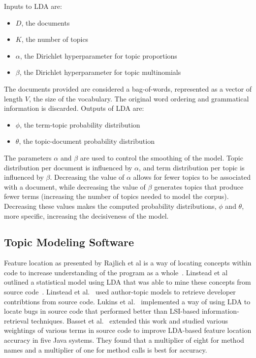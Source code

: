 Inputs to LDA are:
\begin{itemize}
\item $D$, the documents
\item $K$, the number of topics
\item $\alpha$, the Dirichlet hyperparameter for topic proportions
\item $\beta$, the Dirichlet hyperparameter for topic multinomials
\end{itemize}

The documents provided are considered a bag-of-words,
represented as a vector of length $V\!$, the size of the vocabulary.
The original word ordering and grammatical information is discarded.
Outputs of LDA are:
\begin{itemize}
\item $\phi$, the term-topic probability distribution
\item $\theta$, the topic-document probability distribution
\end{itemize}

The parameters $\alpha$ and $\beta$ are used to control the smoothing of the model.
Topic distribution per document is influenced by $\alpha$,
and term distribution per topic is influenced by $\beta$.
Decreasing the value of $\alpha$ allows for fewer topics to be associated with a document,
while decreasing the value of $\beta$ generates topics that produce fewer terms
(increasing the number of topics needed to model the corpus).
Decreasing these values makes the computed probability distributions, $\phi$ and $\theta$,
more specific, increasing the decisiveness of the model.

\subsection{Topic Modeling Software}

Feature location as presented by Rajlich et al
is a way of locating concepts within code to increase understanding of the program as a whole~\cite{Rajlich-Wilde:2002}.
Linstead et al outlined a statistical model using LDA that was able to mine these concepts from source code~\cite{Linstead-etal:2007b}.
Linstead et al.~\cite{Linstead-etal:2007} used author-topic models to retrieve
developer contribtions from source code.
Lukins et al.~\cite{Lukins-etal:2008} implemented a way of using LDA to locate bugs in source
code that performed better than LSI-based information-retrieval
techniques.
Basset et al.~\cite{Bassett-Kraft:2013} extended this work
and studied various weightings of various terms in source code
to improve LDA-based feature location accuracy in five Java systems.
They found that a multiplier of eight for method names and a multiplier
of one for method calls is best for accuracy.

